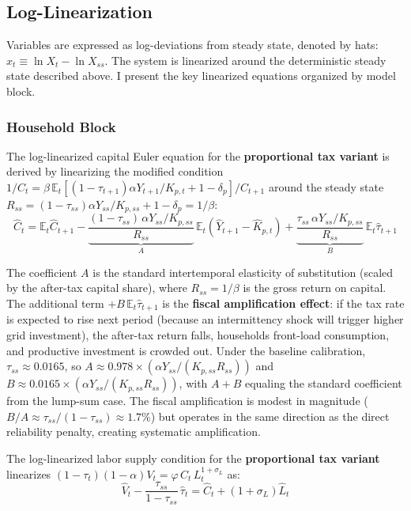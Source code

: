 \documentclass[12pt, a4paper]{article}
\begin{document}
\subsection{Log-Linearization}

Variables are expressed as log-deviations from steady state, denoted by hats: $\hat{x}_t \equiv \ln X_t - \ln X_{ss}$. The system is linearized around the deterministic steady state described above. I present the key linearized equations organized by model block.

\subsubsection{Household Block}

The log-linearized capital Euler equation for the \textbf{proportional tax variant} is derived by linearizing the modified condition $1/C_t = \beta\,\mathbb{E}_t[(1-\tau_{t+1})\alpha Y_{t+1}/K_{p,t} + 1 - \delta_p]/C_{t+1}$ around the steady state $R_{ss} = (1-\tau_{ss})\alpha Y_{ss}/K_{p,ss} + 1 - \delta_p = 1/\beta$:
\begin{equation}
\hat{C}_t = \mathbb{E}_t \hat{C}_{t+1}
    - \underbrace{\frac{(1-\tau_{ss})\,\alpha Y_{ss}/K_{p,ss}}{R_{ss}}}_{A}\, \mathbb{E}_t \!\left(\hat{Y}_{t+1} - \hat{K}_{p,t}\right)
    + \underbrace{\frac{\tau_{ss}\,\alpha Y_{ss}/K_{p,ss}}{R_{ss}}}_{B}\, \mathbb{E}_t \hat{\tau}_{t+1}
\label{eq:euler_lin}
\end{equation}

The coefficient $A$ is the standard intertemporal elasticity of substitution (scaled by the after-tax capital share), where $R_{ss} = 1/\beta$ is the gross return on capital. The additional term $+B\,\mathbb{E}_t\hat{\tau}_{t+1}$ is the \textbf{fiscal amplification effect}: if the tax rate is expected to rise next period (because an intermittency shock will trigger higher grid investment), the after-tax return falls, households front-load consumption, and productive investment is crowded out. Under the baseline calibration, $\tau_{ss} \approx 0.0165$, so $A \approx 0.978 \times (\alpha Y_{ss}/(K_{p,ss}R_{ss}))$ and $B \approx 0.0165 \times (\alpha Y_{ss}/(K_{p,ss}R_{ss}))$, with $A + B$ equaling the standard coefficient from the lump-sum case. The fiscal amplification is modest in magnitude ($B/A \approx \tau_{ss}/(1-\tau_{ss}) \approx 1.7\%$) but operates in the same direction as the direct reliability penalty, creating systematic amplification.

The log-linearized labor supply condition for the \textbf{proportional tax variant} linearizes $(1-\tau_t)(1-\alpha)V_t = \varphi\,C_t\,L_t^{1+\sigma_L}$ as:
\begin{equation}
\hat{V}_t - \frac{\tau_{ss}}{1-\tau_{ss}}\,\hat{\tau}_t = \hat{C}_t + (1+\sigma_L)\hat{L}_t
\label{eq:labor_lin}
\end{equation}
\end{document}
